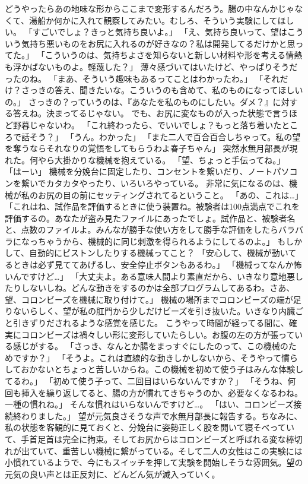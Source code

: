 どうやったらあの地味な形からここまで変形するんだろう。腸の中なんかじゃなくて、湯船か何かに入れて観察してみたい。むしろ、そういう実験にしてほしい。
「すごいでしょ？きっと気持ち良いよ。」
「え、気持ち良いって、望はこういう気持ち悪いものをお尻に入れるのが好きなの？私は開発してるだけかと思ってた。」
「こういうのは、気持ちよさを知らないと新しい材料や形を考える情熱も浮かばないものよ。軽蔑した？」
薄々感づいてはいたけど、やっぱりそうだったのね。
「まあ、そういう趣味もあるってことはわかったわ。」
「それだけ？さっきの答え、聞きたいな。こういうのも含めて、私のものになってほしいの。」
さっきの？っていうのは、『あなたを私のものにしたい。ダメ？』に対する答えね。決まってるじゃない。
でも、お尻に変なものが入った状態で言うほど野暮じゃないわ。
「これ終わったら、でいいでしょ？もっと落ち着いたところで話そう？」
「うん。わかった」
「また二人で百合百合しちゃって。私の望を奪うならそれなりの覚悟をしてもらうわよ春子ちゃん」
突然水無月部長が現れた。何やら大掛かりな機械を抱えている。
「望、ちょっと手伝ってね。」
「はーい」
機械を分娩台に固定したり、コンセントを繋いだり、ノートパソコンを繋いでカタカタやったり、いろいろやっている。
非常に気になるのは、機械が私のお尻の目の前にセッティングされてるということ。
「あの、これは…」
「これはね、試作品を評価するときに使う装置ね。被験者は100点満点でこれを評価するの。あなたが盗み見たファイルにあったでしょ。試作品と、被験者名と、点数のファイルよ。みんなが勝手な使い方をして勝手な評価をしたらバラバラになっちゃうから、機械的に同じ刺激を得られるようにしてるのよ。」
もしかして、自動的にピストンしたりする機械ってこと？
「安心して、機械が動いてるときは必ず見ててあげるし、安全停止ボタンもあるわ。」
「機械ってなんか怖いんですけど…」
「大丈夫よ。ある意味人間より素直だから、いきなり意地悪したりしないしね。どんな動きをするのかは全部プログラムしてあるわ。さあ、望、コロンビーズを機械に取り付けて。」
機械の場所までコロンビーズの端が足りないらしく、望が私の肛門から少しだけビーズを引き抜いた。いきなり内臓ごと引きずりだされるような感覚を感じた。
こうやって時間が経ってる間に、確実にコロンビーズは禍々しい形に変形していたらしい。お腹の左の方が張っている感じがする。
「さっき、なんとか腸をまっすぐにしたのって、この機械のためですか？」
「そうよ。これは直線的な動きしかしないから、そうやって慣らしておかないとちょっと苦しいからね。この機械を初めて使う子はみんな体験してるわ。」
「初めて使う子って、二回目はいらないんですか？」
「そうね、何回も挿入を繰り返してると、腸の方が慣れてきちゃうのか、必要なくなるわね。一種の慣れね。」
そんな慣れはいらないんですけど…。
「はい、コロンビーズ接続終わりました。」
望が元気良さそうな声で水無月部長に報告する。ちなみに、私の状態を客観的に見ておくと、分娩台に姿勢正しく股を開いて寝そべっていて、手首足首は完全に拘束。そしてお尻からはコロンビーズと呼ばれる変な棒切れが出ていて、重苦しい機械に繋がっている。そして二人の女性はこの実験には小慣れているようで、今にもスイッチを押して実験を開始しそうな雰囲気。望の元気の良い声とは正反対に、どんどん気が滅入っていく。
